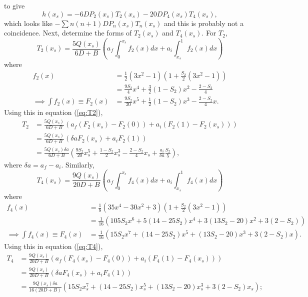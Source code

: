 \documentclass[12pt]{article}
\begin{document}
to give
\begin{equation}\label{eq:intermsofT}
h(x_s) = -6DP_2(x_s)T_2(x_s) - 20DP_4(x_s)T_4(x_s),
\end{equation}
which looks like $-\sum n(n+1)DP_n(x_s)T_n(x_s)$ and this is probably not a coincidence. Next, determine the forms of $T_2(x_s)$ and $T_4(x_s)$. For $T_2$,
\begin{equation}\label{eq:T2}
T_2(x_s) = \frac{5Q(x_s)}{6D+B}\left(a_f\int_0^{x_s} f_2(x)dx + a_i\int_{x_s}^{1} f_2(x)dx \right)
\end{equation}
where
\begin{align*}
f_2(x) &= \frac{1}{2}\left(3x^2-1\right)\left(1+\frac{S_2}{2}\left(3x^2-1\right)\right) \\
&= \frac{9S_2}{4}x^4 + \frac{3}{2}(1-S_2)x^2 - \frac{2-S_2}{4} \\
\implies \int f_2(x) \equiv F_2(x) &= \frac{9S_2}{20}x^5 + \frac{1}{2}(1-S_2)x^3 - \frac{2-S_2}{4}x.
\end{align*}
Using this in equation (\ref{eq:T2}),
\begin{align}\label{eq:T2final}
T_2 &= \frac{5Q(x_s)}{6D+B}\left(a_f(F_2(x_s)-F_2(0)) + a_i(F_2(1)-F_2(x_s))\right) \nonumber \\
&= \frac{5Q(x_s)}{6D+B}\left(\delta a F_2(x_s) + a_i F_2(1)\right) \nonumber \\
&= \frac{5Q(x_s)\delta a}{6D+B}\left(\frac{9S_2}{20}x_s^5 + \frac{1-S_2}{2}x_s^3 - \frac{2-S_2}{4}x_s + \frac{a_i}{\delta a}\frac{S_2}{5}\right),
\end{align}
where $\delta a = a_f - a_i$. Similarly,
\begin{equation}\label{eq:T4}
T_4(x_s) = \frac{9Q(x_s)}{20D+B}\left(a_f\int_0^{x_s} f_4(x)dx + a_i\int_{x_s}^{1} f_4(x)dx \right)
\end{equation}
where
\begin{align*}
f_4(x) &= \frac{1}{8}\left(35x^4 - 30x^2 + 3\right)\left(1+\frac{S_2}{2}\left(3x^2-1\right)\right) \\
&= \frac{1}{16}\left(105S_2x^6 + 5(14-25S_2)x^4 + 3(13S_2 - 20)x^2 + 3(2-S_2)\right) \\
\implies \int f_4(x) \equiv F_4(x) &= \frac{1}{16}\left(15S_2x^7 + (14-25S_2)x^5 + (13S_2-20)x^3 + 3(2-S_2)x\right).
\end{align*}
Using this in equation (\ref{eq:T4}),
\begin{align}\label{eq:T4final}
T_4 &= \frac{9Q(x_s)}{20D+B}\left(a_f(F_4(x_s)-F_4(0)) + a_i(F_4(1)-F_4(x_s))\right) \nonumber \\
&= \frac{9Q(x_s)}{20D+B}\left(\delta a F_4(x_s) + a_iF_4(1)\right) \nonumber \\
&= \frac{9Q(x_s)\delta a}{16(20D+B)}\left(15S_2x_s^7 + (14-25S_2)x_s^5 + (13S_2-20)x_s^3 + 3(2-S_2)x_s\right);
\end{align}
\end{document}
